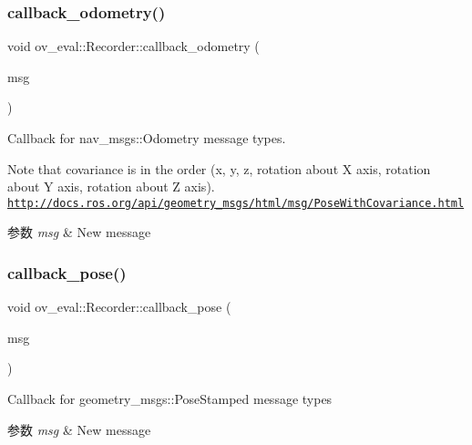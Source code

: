 \subsubsection{\texorpdfstring{callback\+\_\+odometry()}{callback\_odometry()}}
{\footnotesize\ttfamily void ov\+\_\+eval\+::\+Recorder\+::callback\+\_\+odometry (\begin{DoxyParamCaption}\item[{const nav\+\_\+msgs\+::\+Odometry\+Ptr \&}]{msg }\end{DoxyParamCaption})\hspace{0.3cm}{\ttfamily [inline]}}



Callback for nav\+\_\+msgs\+::\+Odometry message types. 

Note that covariance is in the order (x, y, z, rotation about X axis, rotation about Y axis, rotation about Z axis). \href{http://docs.ros.org/api/geometry_msgs/html/msg/PoseWithCovariance.html}{\tt http\+://docs.\+ros.\+org/api/geometry\+\_\+msgs/html/msg/\+Pose\+With\+Covariance.\+html}


\begin{DoxyParams}{参数}
{\em msg} & New message \\
\hline
\end{DoxyParams}
\mbox{\label{classov__eval_1_1Recorder_a0a2cc6684a70ab530c8d7c31ebc1ba9e}} 
\subsubsection{\texorpdfstring{callback\+\_\+pose()}{callback\_pose()}}
{\footnotesize\ttfamily void ov\+\_\+eval\+::\+Recorder\+::callback\+\_\+pose (\begin{DoxyParamCaption}\item[{const geometry\+\_\+msgs\+::\+Pose\+Stamped\+Ptr \&}]{msg }\end{DoxyParamCaption})\hspace{0.3cm}{\ttfamily [inline]}}



Callback for geometry\+\_\+msgs\+::\+Pose\+Stamped message types 


\begin{DoxyParams}{参数}
{\em msg} & New message \\
\hline
\end{DoxyParams}
\mbox{\label{classov__eval_1_1Recorder_afe156131ed31a4f35d7fea30d4221293}} 
